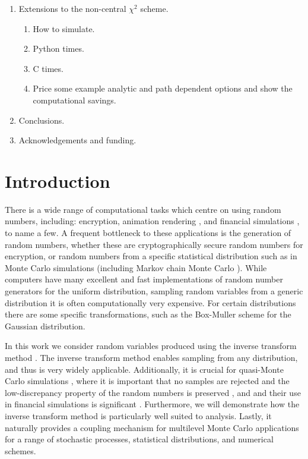 \documentclass[manuscript]{acmart}
\begin{document}
{\begin{enumerate}
\begin{enumerate}
\item Demonstrate similar results appear to hold for the Milstein scheme. 
\end{enumerate}
\item Extensions to  the non-central $ \chi^2 $ scheme. 
\begin{enumerate}
\item How to simulate. 
\item Python times. 
\item C times. 
\item Price some example analytic and path dependent options and show the computational savings. 
\end{enumerate}
\item Conclusions. 
\item Acknowledgements and funding. 
\end{enumerate}
}

\clearpage
\section{Introduction}

There is a wide range of computational tasks which centre on using random numbers, including: encryption, animation rendering \citep{lee2017vectorized}, and financial simulations \citep{glasserman2013monte}, to name a few. A frequent bottleneck to these applications is the generation of random numbers, whether these are cryptographically secure random numbers for encryption, or random numbers from a specific statistical distribution such as in Monte Carlo simulations (including Markov chain Monte Carlo \citep{hoang2013complexity,scheichl2017quasi}).  While computers have many excellent and fast implementations of random number generators for the uniform distribution, sampling random variables from a generic distribution it is often computationally very expensive. For certain distributions there are some specific transformations, such as the Box-Muller scheme \citep{box1958note} for the Gaussian distribution. 

In this work we consider random variables produced using the inverse transform method \citep{glasserman2013monte}. The inverse transform method enables sampling from any distribution, and thus is very widely applicable. Additionally, it is crucial for quasi-Monte Carlo simulations \citep{giles2009multilevel_qmc,lecuyer2016randomized}, where it is important that no samples are rejected and the low-discrepancy property of the random numbers is preserved \citep{tezuka1995uniform}, and and their use in financial simulations is significant \citep{joy1996quasi,xu2015high}. Furthermore, we will demonstrate how the inverse transform method is particularly well suited to analysis. Lastly, it naturally provides a coupling mechanism for multilevel Monte Carlo applications for a range of stochastic processes, statistical distributions, and numerical schemes. 
\end{document}
